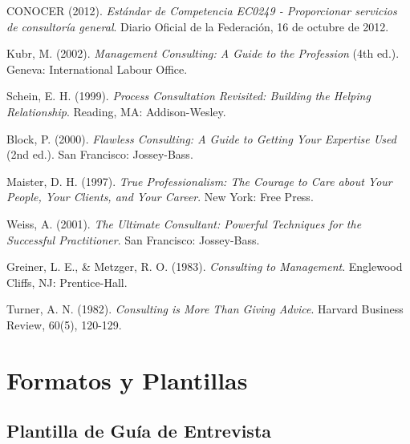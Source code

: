 \documentclass[12pt,letterpaper,oneside]{book}
\begin{document}
\begin{thebibliography}{99}

 CONOCER (2012). \textit{Estándar de Competencia EC0249 - Proporcionar servicios de consultoría general}. Diario Oficial de la Federación, 16 de octubre de 2012.

 Kubr, M. (2002). \textit{Management Consulting: A Guide to the Profession} (4th ed.). Geneva: International Labour Office.

 Schein, E. H. (1999). \textit{Process Consultation Revisited: Building the Helping Relationship}. Reading, MA: Addison-Wesley.

 Block, P. (2000). \textit{Flawless Consulting: A Guide to Getting Your Expertise Used} (2nd ed.). San Francisco: Jossey-Bass.

 Maister, D. H. (1997). \textit{True Professionalism: The Courage to Care about Your People, Your Clients, and Your Career}. New York: Free Press.

 Weiss, A. (2001). \textit{The Ultimate Consultant: Powerful Techniques for the Successful Practitioner}. San Francisco: Jossey-Bass.

 Greiner, L. E., \& Metzger, R. O. (1983). \textit{Consulting to Management}. Englewood Cliffs, NJ: Prentice-Hall.

 Turner, A. N. (1982). \textit{Consulting is More Than Giving Advice}. Harvard Business Review, 60(5), 120-129.

\end{thebibliography}

\appendix

\chapter{Formatos y Plantillas}

\section{Plantilla de Guía de Entrevista}
\end{document}
